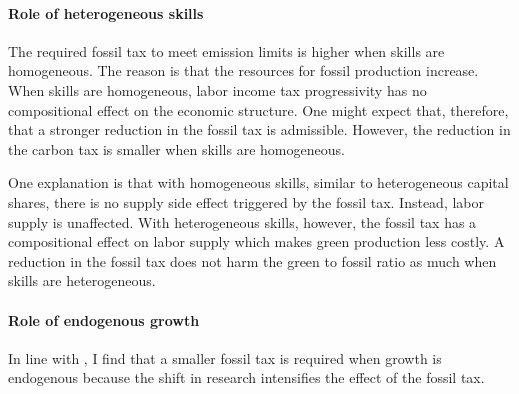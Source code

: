 \paragraph{Role of heterogeneous skills}

The required fossil tax to meet emission limits is higher when skills are homogeneous. The reason is that the resources for fossil production increase.
When skills are homogeneous, labor income tax progressivity has no compositional effect on the economic structure. One might expect that, therefore, that a stronger reduction in the fossil tax is admissible. However, the reduction in the carbon tax is smaller when skills are homogeneous. 

One explanation is that with homogeneous skills, similar to heterogeneous capital shares, there is no supply side effect triggered by the fossil tax. Instead, labor supply is unaffected. With heterogeneous skills, however, the fossil tax has a compositional effect on labor supply which makes green production less costly. A reduction in the fossil tax does not harm the green to fossil ratio as much when skills are heterogeneous. 

\paragraph{Role of endogenous growth}
In line with \cite{Fried2018ClimateAnalysis}, I find that a smaller fossil tax is required when growth is endogenous because the shift in research intensifies the effect of the fossil tax.  




